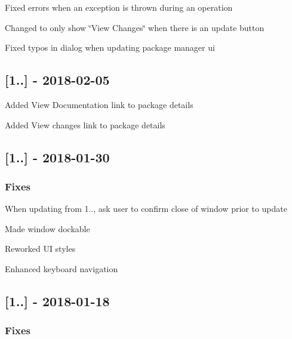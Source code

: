 \begin{DoxyItemize}
\item Fixed errors when an exception is thrown during an operation
\item Changed to only show \char`\"{}\+View Changes\char`\"{} when there is an update button
\item Fixed typos in dialog when updating package manager ui
\end{DoxyItemize}

\subsection*{\mbox{[}1..\mbox{]} -\/ 2018-\/02-\/05}


\begin{DoxyItemize}
\item Added \textquotesingle{}View Documentation\textquotesingle{} link to package details
\item Added \textquotesingle{}View changes\textquotesingle{} link to package details
\end{DoxyItemize}

\subsection*{\mbox{[}1..\mbox{]} -\/ 2018-\/01-\/30}

\subsubsection*{Fixes}


\begin{DoxyItemize}
\item When updating from 1.., ask user to confirm close of window prior to update
\item Made window dockable
\item Reworked UI styles
\item Enhanced keyboard navigation
\end{DoxyItemize}

\subsection*{\mbox{[}1..\mbox{]} -\/ 2018-\/01-\/18}

\subsubsection*{Fixes}


